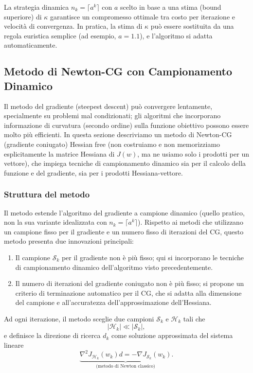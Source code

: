 \documentclass[a4paper,12pt]{article}
\numberwithin{equation}{section}
\numberwithin{figure}{section}
\numberwithin{table}{section}
\begin{document}
La strategia dinamica \(n_k = \lceil a^k \rceil\) con \(a\) scelto in base a una stima (bound superiore) di \(\kappa\) garantisce un compromesso ottimale tra costo per iterazione e velocità di convergenza. In pratica, la stima di \(\kappa\) può essere sostituita da una regola euristica semplice (ad esempio, \(a=1.1\)), e l'algoritmo si adatta automaticamente.

\newpage
\subsection{Metodo di Newton-CG con Campionamento Dinamico}

Il metodo del gradiente (steepest descent) può convergere lentamente, specialmente su problemi mal condizionati; gli algoritmi che incorporano informazione di curvatura (secondo ordine) sulla funzione obiettivo possono essere molto più efficienti. In questa sezione descriviamo un metodo di Newton-CG (gradiente coniugato) Hessian free (non costruiamo e non memorizziamo esplicitamente la matrice Hessiana di $J(w)$, ma ne usiamo solo i prodotti per un vettore), che impiega tecniche di campionamento dinamico sia per il calcolo della funzione e del gradiente, sia per i prodotti Hessiana-vettore.

\subsubsection{Struttura del metodo}

Il metodo estende l'algoritmo del gradiente a campione dinamico (quello pratico, non la sua variante idealizzata con \(n_k = \lceil a^k \rceil\)). Rispetto ai metodi che utilizzano un campione fisso per il gradiente e un numero fisso di iterazioni del CG, questo metodo presenta due innovazioni principali:

\begin{enumerate}
    \item Il campione \(\mathcal{S}_k\) per il gradiente non è più fisso; qui si incorporano le tecniche di campionamento dinamico dell'algoritmo visto precedentemente.
    \item Il numero di iterazioni del gradiente coniugato non è più fisso; si propone un criterio di terminazione automatico per il CG, che si adatta alla dimensione del campione e all'accuratezza dell'approssimazione dell'Hessiana.
\end{enumerate}

Ad ogni iterazione, il metodo sceglie due campioni \(\mathcal{S}_k\) e \(\mathcal{H}_k\) tali che
\[
|\mathcal{H}_k| \ll |\mathcal{S}_k|,
\]
e definisce la direzione di ricerca \(d_k\) come soluzione approssimata del sistema lineare
\[
\underbrace{\nabla^2 J_{\mathcal{H}_k}(w_k) d = -\nabla J_{\mathcal{S}_k}(w_k)}_{\text{(metodo di Newton classico)}}. \tag{5.31}\label{eq:5_31}
\]
\end{document}
